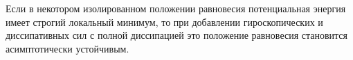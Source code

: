 

\begin{to_thr}
    Если в некотором изолированном положении равновесия потенциальная энергия имеет строгий локальный минимум, то при добавлении гироскопических и диссипативных сил с полной диссипацией это положение равновесия становится асимптотически устойчивым.
\end{to_thr}















